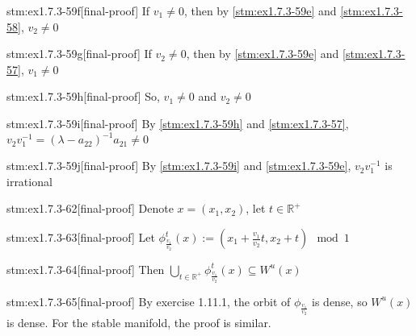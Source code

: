 \begin{stm}{stm:ex1.7.3-59f}[final-proof]
If $v_1 \ne 0$, then by \ref{stm:ex1.7.3-59e} and \ref{stm:ex1.7.3-58}, $v_2 \ne 0$
\end{stm}

\begin{stm}{stm:ex1.7.3-59g}[final-proof]
If $v_2 \ne 0$, then by \ref{stm:ex1.7.3-59e} and \ref{stm:ex1.7.3-57}, $v_1 \ne 0$
\end{stm}

\begin{stm}{stm:ex1.7.3-59h}[final-proof]
So, $v_1 \ne 0$ and $v_2 \ne 0$
\end{stm}

\begin{stm}{stm:ex1.7.3-59i}[final-proof]
By \ref{stm:ex1.7.3-59h} and \ref{stm:ex1.7.3-57}, $v_2 v_1^{-1} = (\lambda - a_{22})^{-1} a_{21} \ne 0$
\end{stm}

\begin{stm}{stm:ex1.7.3-59j}[final-proof]
By \ref{stm:ex1.7.3-59i} and \ref{stm:ex1.7.3-59e}, $v_2 v_1^{-1}$ is irrational
\end{stm}

\begin{stm}{stm:ex1.7.3-62}[final-proof]
Denote $x = (x_1, x_2)$, let $t \in \mathbb{R}^+$
\end{stm}

\begin{stm}{stm:ex1.7.3-63}[final-proof]
Let $\phi_{\frac{v_1}{v_2}}^t(x) := (x_1 + \frac{v_1}{v_2} t, x_2 + t) \mod 1$
\end{stm}

\begin{stm}{stm:ex1.7.3-64}[final-proof]
Then $\bigcup_{t \in \mathbb{R}^+} \phi_{\frac{v_1}{v_2}}^t(x) \subseteq W^u(x)$
\end{stm}

\begin{stm}{stm:ex1.7.3-65}[final-proof]
By exercise 1.11.1, the orbit of $\phi_{\frac{v_1}{v_2}}$ is dense, so $W^u(x)$ is dense. For the stable manifold, the proof is similar.
\end{stm}
